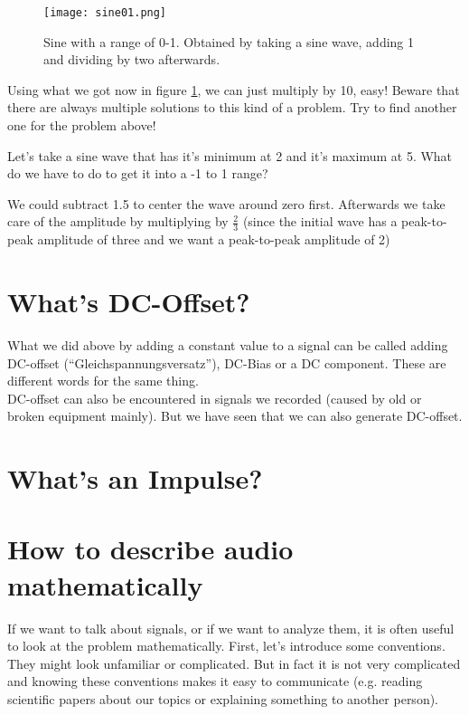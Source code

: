 \begin{figure}[h!]
 	\centering
 	\texttt{[image: sine01.png]}
 	\caption[sine 0 to 1]
 	{Sine with a range of 0-1. Obtained by taking a sine wave, adding 1 and dividing by two afterwards.}
 	\label{fig:sine01}
 \end{figure} 

Using what we got now in figure \ref{fig:sine01}, we can just multiply by 10, easy! Beware that there are always multiple solutions to this kind of a problem. Try to find another one for the problem above!

\begin{question}
Let's take a sine wave that has it's minimum at 2 and it's maximum at 5. What do we have to do to get it into a -1 to 1 range?
\end{question}
\begin{Answer}
We could subtract 1.5 to center the wave around zero first. Afterwards we take care of the amplitude by multiplying by $\frac{2}{3}$ (since the initial wave has a peak-to-peak amplitude of three and we want a peak-to-peak amplitude of 2)
\end{Answer}



\section{What's DC-Offset?}

What we did above by adding a constant value to a signal can be called adding DC-offset (``Gleichspannungsversatz''), DC-Bias or a DC component. These are different words for the same thing.\\
DC-offset can also be encountered in signals we recorded (caused by old or broken equipment mainly). But we have seen that we can also generate DC-offset.



\section{What's an Impulse?}



\section{How to describe audio mathematically}

If we want to talk about signals, or if we want to analyze them, it is often useful to look at the problem mathematically. First, let's introduce some conventions. They might look unfamiliar or complicated. But in fact it is not very complicated and knowing these conventions makes it easy to communicate (e.g. reading scientific papers about our topics or explaining something to another person).

